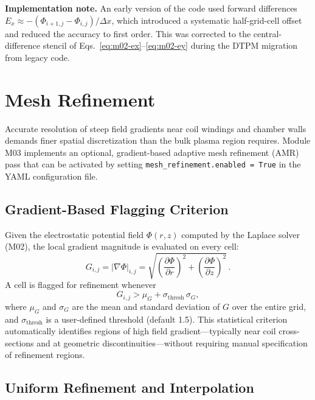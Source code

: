 \documentclass[11pt,a4paper]{report}
\newcommand{\dx}{\Delta x}
\begin{document}
\textbf{Implementation note.}  An early version of the code used forward differences $E_x \approx -(\Phi_{i+1,j} - \Phi_{i,j})/\dx$, which introduced a systematic half-grid-cell offset and reduced the accuracy to first order.  This was corrected to the central-difference stencil of Eqs.~\eqref{eq:m02-ex}--\eqref{eq:m02-ey} during the DTPM migration from legacy code.


\section{Mesh Refinement}
\label{sec:m03}

Accurate resolution of steep field gradients near coil windings and chamber walls demands finer spatial discretization than the bulk plasma region requires.  Module M03 implements an optional, gradient-based adaptive mesh refinement (AMR) pass that can be activated by setting \texttt{mesh\_refinement.enabled = True} in the YAML configuration file.

\subsection{Gradient-Based Flagging Criterion}

Given the electrostatic potential field $\Phi(r,z)$ computed by the Laplace solver (M02), the local gradient magnitude is evaluated on every cell:
\begin{equation}
  G_{i,j} = |\nabla\Phi|_{i,j}
          = \sqrt{\left(\frac{\partial\Phi}{\partial r}\right)^{\!2}
                 +\left(\frac{\partial\Phi}{\partial z}\right)^{\!2}}\,.
  \label{eq:amr-gradient}
\end{equation}
A cell is flagged for refinement whenever
\begin{equation}
  G_{i,j} > \mu_G + \sigma_\mathrm{thresh}\,\sigma_G,
  \label{eq:amr-flag}
\end{equation}
where $\mu_G$ and $\sigma_G$ are the mean and standard deviation of $G$ over the entire grid, and $\sigma_\mathrm{thresh}$ is a user-defined threshold (default 1.5).  This statistical criterion automatically identifies regions of high field gradient---typically near coil cross-sections and at geometric discontinuities---without requiring manual specification of refinement regions.

\subsection{Uniform Refinement and Interpolation}
\end{document}
